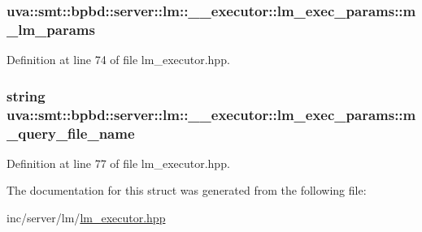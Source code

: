 \subsubsection[{m\+\_\+lm\+\_\+params}]{ uva\+::smt\+::bpbd\+::server\+::lm\+::\+\_\+\+\_\+executor\+::lm\+\_\+exec\+\_\+params\+::m\+\_\+lm\+\_\+params}\label{structuva_1_1smt_1_1bpbd_1_1server_1_1lm_1_1____executor_1_1lm__exec__params_a0389806054816e5c22e503a3822d3d99}


Definition at line 74 of file lm\+\_\+executor.\+hpp.

\hypertarget{structuva_1_1smt_1_1bpbd_1_1server_1_1lm_1_1____executor_1_1lm__exec__params_add893637044e50b058543f943b79c785}{}
\subsubsection[{m\+\_\+query\+\_\+file\+\_\+name}]{\setlength{\rightskip}{0pt plus 5cm}string uva\+::smt\+::bpbd\+::server\+::lm\+::\+\_\+\+\_\+executor\+::lm\+\_\+exec\+\_\+params\+::m\+\_\+query\+\_\+file\+\_\+name}\label{structuva_1_1smt_1_1bpbd_1_1server_1_1lm_1_1____executor_1_1lm__exec__params_add893637044e50b058543f943b79c785}


Definition at line 77 of file lm\+\_\+executor.\+hpp.



The documentation for this struct was generated from the following file\+:\begin{DoxyCompactItemize}
\item 
inc/server/lm/\hyperlink{lm__executor_8hpp}{lm\+\_\+executor.\+hpp}\end{DoxyCompactItemize}
